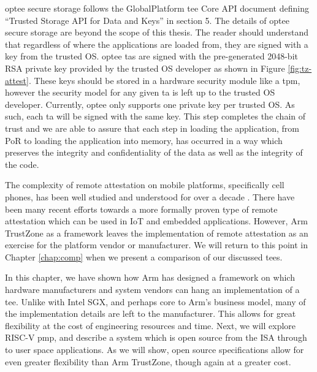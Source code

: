 \gls{optee} secure storage follows the GlobalPlatform \gls{tee} Core API document \cite{GPD5} defining ``Trusted Storage API for Data and Keys'' in section 5. The details of \gls{optee} secure storage are beyond the scope of this thesis. The reader should understand that regardless of where the applications are loaded from, they are signed with a key from the trusted OS. \gls{optee} \glspl{ta} are signed with the pre-generated 2048-bit RSA private key provided by the trusted OS developer as shown in Figure \ref{fig:tz-attest}. These keys should be stored in a hardware security module like a \gls{tpm}, however the security model for any given \gls{ta} is left up to the trusted OS developer. Currently, \gls{optee} only supports one private key per trusted OS. As such, each \gls{ta} will be signed with the same key. This step completes the \gls{chain of trust} and we are able to assure that each step in loading the application, from PoR to loading the application into memory, has occurred in a way which preserves the integrity and confidentiality of the data as well as the integrity of the code.

The complexity of remote attestation on mobile platforms, specifically cell phones, has been well studied and understood for over a decade \cite{nauman2010beyond}. There have been many recent efforts towards a more formally proven type of remote attestation \cite{cabodi2015formal, eldefrawy2017hydra} which can be used in IoT and embedded applications. However, Arm TrustZone as a framework leaves the implementation of remote attestation as an exercise for the platform vendor or manufacturer. We will return to this point in Chapter \ref{chap:comp} when we present a comparison of our discussed \glspl{tee}.

In this chapter, we have shown how Arm has designed a framework on which hardware manufacturers and system vendors can hang an implementation of a \gls{tee}. Unlike with Intel SGX, and perhaps core to Arm's business model, many of the implementation details are left to the manufacturer. This allows for great flexibility at the cost of engineering resources and time. Next, we will explore RISC-V \gls{pmp}, and describe a system which is open source from the ISA through to user space applications. As we will show, open source specifications allow for even greater flexibility than Arm TrustZone, though again at a greater cost.
